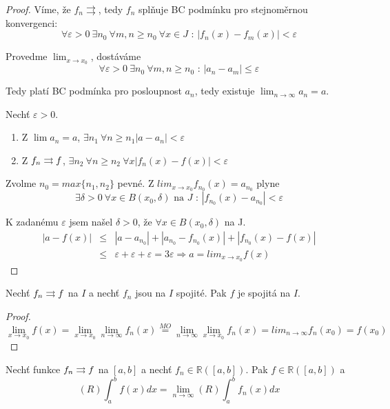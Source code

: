 \begin{proof}
Víme, že $f_n \rightrightarrows$, tedy $f_n$ splňuje BC podmínku pro stejnoměrnou konvergenci:
$$\forall \varepsilon > 0 \ \exists n_0 \ \forall m,n \geq n_0 \ \forall x \in J \textrm{ : } |f_n(x) - f_m(x)| < \varepsilon $$

Provedme $\lim_{x \to x_0}$, dostáváme 
$$\forall \varepsilon>0 \ \exists n_0 \ \forall m,n \geq n_0 \textrm{ : } |a_n - a_m| \leq \varepsilon$$

Tedy platí BC podmínka pro posloupnost $a_n$, tedy existuje $\lim_{n \to \infty}a_n = a$.

Nechť $\varepsilon > 0$. 
\begin{enumerate}
\item Z $\lim a_n = a$, $ \exists n_1 \ \forall n \geq n_1 |a - a_n| < \varepsilon $
\item Z $f_n \rightrightarrows f$, $ \exists n_2 \ \forall n \geq n_2 \ \forall x |f_n(x) - f(x)| < \varepsilon$
\end{enumerate}

Zvolme $n_0 = max \{n_1,n_2\}$ pevné. Z $lim_{x \to x_0}f_{n_0}(x) = a_{n_0}$ plyne 
$$\exists \delta > 0 \ \forall x \in B(x_0,\delta) \textrm{ na } J \textrm{ : } |f_{n_0}(x) - a_{n_0}| < \varepsilon$$

K zadanému $\varepsilon$ jsem našel $\delta > 0$, že $\forall x \in B(x_0, \delta)$ na J.
\begin{eqnarray*}
|a - f(x)| & \leq & |a - a_{n_0}| + |a_{n_0} - f_{n_0}(x)| + |f_{n_0}(x) - f(x)| \\
& \leq & \varepsilon + \varepsilon + \varepsilon = 3\varepsilon \Rightarrow a=lim_{x \to x_0}f(x)
\end{eqnarray*}

\end{proof}

\begin{dusledek}
Nechť $f_n \rightrightarrows f$ na $I$ a nechť $f_n$ jsou na $I$ spojité. Pak $f$ je spojitá na $I$.
\end{dusledek}
\begin{proof}
$$\lim_{x \to x_0}f(x) = \lim_{x \to x_0} \lim_{n \to \infty}f_n(x) \overset{MO}{=} \lim_{n \to \infty}\lim_{x \to x_0}f_n(x)=lim_{n \to \infty}f_n(x_0) = f(x_0)$$
\end{proof}

\begin{vetal}
Nechť funkce $f_n \rightrightarrows f$ na $[a,b]$ a nechť $f_n \in \mathbb{R} ([a,b])$. Pak $f \in \mathbb{R}([a,b])$ a 
$$(R) \int_a^b f(x) dx = \lim_{n \rightarrow \infty} (R) \int_a^b f_n(x) dx$$
\end{vetal}

